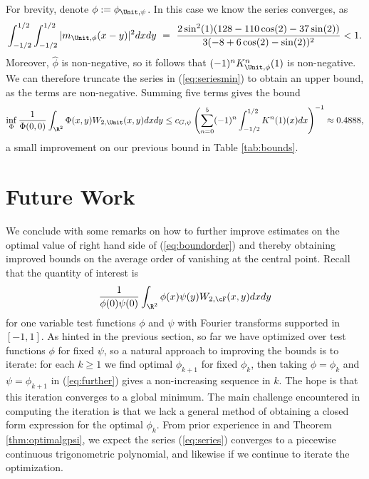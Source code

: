 \documentclass[12pt, reqno]{amsart}
\numberwithin{equation}{section}
\theoremstyle{definition}
\theoremstyle{remark}
\begin{document}
For brevity, denote $\phi := \phi_{\Unit, \psi}$. In this case we know the series converges, as
\begin{align}
		\int_{-1/2}^{1/2} \int_{-1/2}^{1/2} |m_{\Unit, \phi}(x - y)|^2 dx dy \ = \  \frac{2 \sin^2 (1) (128 - 110 \cos (2) - 37 \sin (2))}{3 (-8 + 6 \cos (2) - \sin (2))^2} < 1.
\end{align}
Moreover, $\widehat{\phi}$ is non-negative, so it follows that $(-1)^n K^n_{\Unit, \phi}(1)$ is non-negative. We can therefore truncate the series in (\ref{eq:seriesmin}) to obtain an upper bound, as the terms are non-negative. Summing five terms gives the bound
	\begin{equation}
		\inf_\Phi \frac{1}{\Phi(0, 0)} \int_{\R^2} \Phi(x, y) W_{2, \Unit} (x, y) dx dy \leq c_{G, \psi}\left( \sum_{n = 0}^5 (-1)^n \int_{-1/2}^{1/2} K^n (1) (x) dx \right)^{-1} \approx 0.4888,
	\end{equation}
a small improvement on our previous bound in Table \ref{tab:bounds}. 


\section{Future Work}

We conclude with some remarks on how to further improve estimates on the optimal value of right hand side of (\ref{eq:boundorder}) and thereby obtaining improved bounds on the average order of vanishing at the central point. Recall that the quantity of interest is 
\begin{equation}
	 \frac{1}{\phi(0) \psi(0)} \int_{\R^2} \phi(x) \psi(y) W_{2, \cF} (x, y) dx dy \label{eq:further}
\end{equation}
for one variable test functions $\phi$ and $\psi$ with Fourier transforms supported in $[-1, 1]$. As hinted in the previous section, so far we have optimized over test functions $\phi$ for fixed $\psi$, so a natural approach to improving the bounds is to iterate: for each $k \geq 1$ we find optimal $\phi_{k + 1}$ for fixed $\phi_{k}$, then taking $\phi = \phi_k$ and $\psi = \phi_{k + 1}$ in (\ref{eq:further}) gives a non-increasing sequence in $k$. The hope is that this iteration converges to a global minimum. The main challenge encountered in computing the iteration is that we lack a general method of obtaining a closed form expression for the optimal $\phi_k$. From prior experience in \cite{ILS, FM} and Theorem \ref{thm:optimalgpsi}, we expect the series (\ref{eq:series}) converges to a piecewise continuous trigonometric polynomial, and likewise if we continue to iterate the optimization. 
\end{document}
